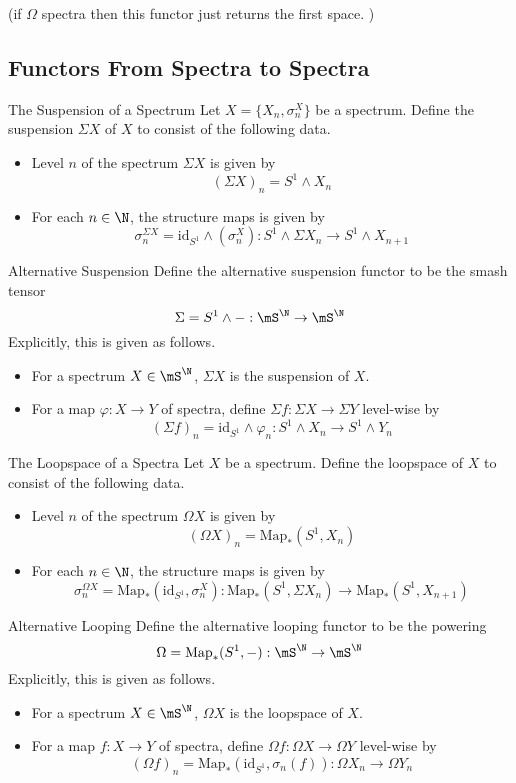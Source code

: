 \documentclass[a4paper]{article}
\begin{document}
(if $\Omega$ spectra then this functor just returns the first space. )

\subsection{Functors From Spectra to Spectra}
\begin{defn}{The Suspension of a Spectrum}{} Let $X=\{X_n,\sigma_n^X\}$ be a spectrum. Define the suspension $\Sigma X$ of $X$ to consist of the following data. 
\begin{itemize}
\item Level $n$ of the spectrum $\Sigma X$ is given by $$(\Sigma X)_n=S^1\wedge X_n$$
\item For each $n\in\N$, the structure maps is given by $$\sigma_n^{\Sigma X}=\text{id}_{S^1}\wedge(\sigma_n^X):S^1\wedge\Sigma X_n\to S^1\wedge X_{n+1}$$
\end{itemize}
\end{defn}

\begin{defn}{Alternative Suspension}{} Define the alternative suspension functor to be the smash tensor $$\Sigma=S^1\wedge -:\mS^\N\to\mS^\N$$ Explicitly, this is given as follows. 
\begin{itemize}
\item For a spectrum $X\in\mS^\N$, $\Sigma X$ is the suspension of $X$. 
\item For a map $\varphi:X\to Y$ of spectra, define $\Sigma f:\Sigma X\to\Sigma Y$ level-wise by $$(\Sigma f)_n=\text{id}_{S^1}\wedge\varphi_n:S^1\wedge X_n\to S^1\wedge Y_n$$
\end{itemize}
\end{defn}

\begin{defn}{The Loopspace of a Spectra}{} Let $X$ be a spectrum. Define the loopspace of $X$ to consist of the following data.
\begin{itemize}
\item Level $n$ of the spectrum $\Omega X$ is given by $$(\Omega X)_n=\text{Map}_\ast(S^1,X_n)$$
\item For each $n\in\N$, the structure maps is given by $$\sigma_n^{\Omega X}=\text{Map}_\ast(\text{id}_{S^1},\sigma_n^X):\text{Map}_\ast(S^1,\Sigma X_n)\to\text{Map}_\ast(S^1,X_{n+1})$$
\end{itemize}
\end{defn}

\begin{defn}{Alternative Looping}{} Define the alternative looping functor to be the powering $$\Omega=\text{Map}_\ast(S^1,-):\mS^\N\to\mS^\N$$ Explicitly, this is given as follows. 
\begin{itemize}
\item For a spectrum $X\in\mS^\N$, $\Omega X$ is the loopspace of $X$. 
\item For a map $f:X\to Y$ of spectra, define $\Omega f:\Omega X\to\Omega Y$ level-wise by $$(\Omega f)_n=\text{Map}_\ast(\text{id}_{S^1},\sigma_n(f)):\Omega X_n\to\Omega Y_n$$
\end{itemize}
\end{defn}
\end{document}
